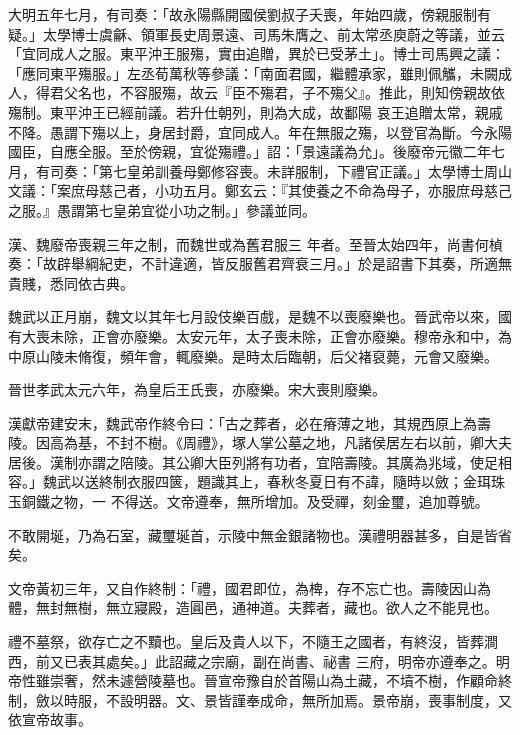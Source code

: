 \begin{pinyinscope}
 大明五年七月，有司奏：「故永陽縣開國侯劉叔子夭喪，年始四歲，傍親服制有疑。」太學博士虞龢、領軍長史周景遠、司馬朱膺之、前太常丞庾蔚之等議，並云「宜同成人之服。東平沖王服殤，實由追贈，異於已受茅土」。博士司馬興之議：「應同東平殤服。」左丞荀萬秋等參議：「南面君國，繼體承家，雖則佩觿，未闕成人，得君父名也，不容服殤，故云『臣不殤君，子不殤父』。推此，則知傍親故依殤制。東平沖王已經前議。若升仕朝列，則為大成，故鄱陽
 哀王追贈太常，親戚不降。愚謂下殤以上，身居封爵，宜同成人。年在無服之殤，以登官為斷。今永陽國臣，自應全服。至於傍親，宜從殤禮。」詔：「景遠議為允」。後廢帝元徽二年七月，有司奏：「第七皇弟訓養母鄭修容喪。未詳服制，下禮官正議。」太學博士周山文議：「案庶母慈己者，小功五月。鄭玄云：『其使養之不命為母子，亦服庶母慈己之服。』愚謂第七皇弟宜從小功之制。」參議並同。



 漢、魏廢帝喪親三年之制，而魏世或為舊君服三
 年者。至晉太始四年，尚書何楨奏：「故辟舉綱紀吏，不計違適，皆反服舊君齊衰三月。」於是詔書下其奏，所適無貴賤，悉同依古典。



 魏武以正月崩，魏文以其年七月設伎樂百戲，是魏不以喪廢樂也。晉武帝以來，國有大喪未除，正會亦廢樂。太安元年，太子喪未除，正會亦廢樂。穆帝永和中，為中原山陵未脩復，頻年會，輒廢樂。是時太后臨朝，后父褚裒薨，元會又廢樂。



 晉世孝武太元六年，為皇后王氏喪，亦廢樂。宋大喪則廢樂。



 漢獻帝建安末，魏武帝作終令曰：「古之葬者，必在瘠薄之地，其規西原上為壽陵。因高為基，不封不樹。《周禮》，塚人掌公墓之地，凡諸侯居左右以前，卿大夫居後。漢制亦謂之陪陵。其公卿大臣列將有功者，宜陪壽陵。其廣為兆域，使足相容。」魏武以送終制衣服四篋，題識其上，春秋冬夏日有不諱，隨時以斂；金珥珠玉銅鐵之物，一
 不得送。文帝遵奉，無所增加。及受禪，刻金璽，追加尊號。



 不敢開埏，乃為石室，藏璽埏首，示陵中無金銀諸物也。漢禮明器甚多，自是皆省矣。



 文帝黃初三年，又自作終制：「禮，國君即位，為椑，存不忘亡也。壽陵因山為體，無封無樹，無立寢殿，造圓邑，通神道。夫葬者，藏也。欲人之不能見也。



 禮不墓祭，欲存亡之不黷也。皇后及貴人以下，不隨王之國者，有終沒，皆葬澗西，前又已表其處矣。」此詔藏之宗廟，副在尚書、祕書
 三府，明帝亦遵奉之。明帝性雖崇奢，然未遽營陵墓也。晉宣帝豫自於首陽山為土藏，不墳不樹，作顧命終制，斂以時服，不設明器。文、景皆謹奉成命，無所加焉。景帝崩，喪事制度，又依宣帝故事。




\end{pinyinscope}
